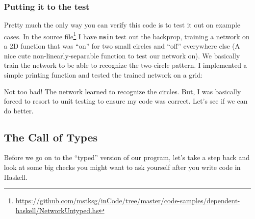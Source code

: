 \documentclass[]{article}
\newenvironment{Shaded}{}{}
\newcommand{\KeywordTok}[1]{\textcolor[rgb]{0.00,0.44,0.13}{\textbf{{#1}}}}
\newcommand{\CommentTok}[1]{\textcolor[rgb]{0.38,0.63,0.69}{\textit{{#1}}}}
\newcommand{\NormalTok}[1]{{#1}}
\renewcommand{\href}[2]{#2\footnote{\url{#1}}}
\begin{document}
\subsubsection{Putting it to the test}\label{putting-it-to-the-test}

Pretty much the only way you can verify this code is to test it out on
example cases. In the
\href{https://github.com/mstksg/inCode/tree/master/code-samples/dependent-haskell/NetworkUntyped.hs}{source
file} I have \texttt{main} test out the backprop, training a network on
a 2D function that was ``on'' for two small circles and ``off''
everywhere else (A nice cute non-linearly-separable function to test our
network on). We basically train the network to be able to recognize the
two-circle pattern. I implemented a simple printing function and tested
the trained network on a grid:

\begin{Shaded}
\end{Shaded}

Not too bad! The network learned to recognize the circles. But, I was
basically forced to resort to unit testing to ensure my code was
correct. Let's see if we can do better.

\subsection{The Call of Types}\label{the-call-of-types}

Before we go on to the ``typed'' version of our program, let's take a
step back and look at some big checks you might want to ask yourself
after you write code in Haskell.
\end{document}
